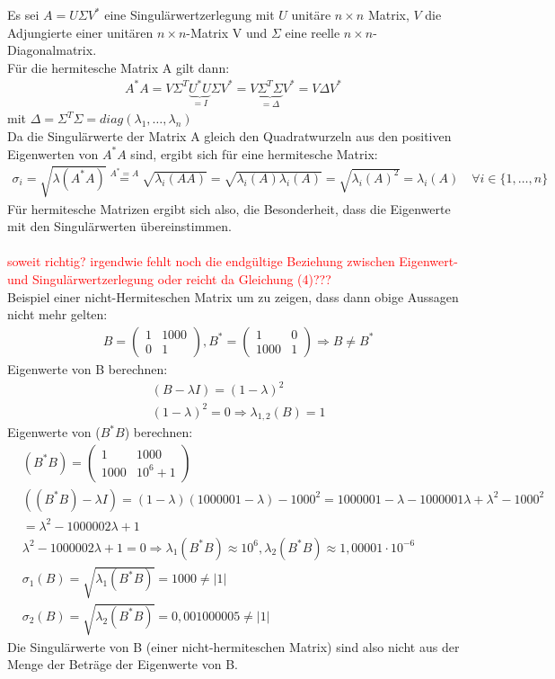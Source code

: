 Es sei $A=U\Sigma V^*$ eine Singulärwertzerlegung mit $U$ unitäre $n\times n$ Matrix, $V$ die Adjungierte einer unitären $n\times n$-Matrix V und $\Sigma$ eine reelle $n\times n$-Diagonalmatrix.\\
Für die hermitesche Matrix A gilt dann:
\begin{align}
A^*A=V\Sigma^T\underbrace{U^*U}_{=I}\Sigma V^* = V\underbrace{\Sigma^T\Sigma}_{=\Delta}V^*=V\Delta V^*
\end{align}
mit $\Delta=\Sigma^T \Sigma=diag(\lambda_1,\ldots,\lambda_n)$\\
\newline
Da die Singulärwerte der Matrix A gleich den Quadratwurzeln aus den positiven Eigenwerten von $A^*A$ sind, ergibt sich für eine hermitesche Matrix:
\begin{align*}
	\sigma_i=\sqrt{\lambda(A^*A)} \overset{A^*=A}{=} \sqrt{\lambda_i(AA)}=\sqrt{\lambda_i(A)\lambda_i(A)}=\sqrt{\lambda_i(A)^2}=\lambda_i(A) \quad \forall i\in\{1,\ldots,n\}
\end{align*}
Für hermitesche Matrizen ergibt sich also, die Besonderheit, dass die Eigenwerte mit den Singulärwerten übereinstimmen.\\\\
\textcolor{red}{soweit richtig? irgendwie fehlt noch die endgültige Beziehung zwischen Eigenwert- und Singulärwertzerlegung oder reicht da Gleichung (4)???}\\
\newline
Beispiel einer nicht-Hermiteschen Matrix um zu zeigen, dass dann obige Aussagen nicht mehr gelten:
\begin{align*}
&B=
\begin{pmatrix}
	1 & 1000\\
	0 & 1
\end{pmatrix}, 
B^*=
\begin{pmatrix}
1 & 0\\
1000 & 1
\end{pmatrix}
\Rightarrow B\neq B^*\end{align*}
Eigenwerte von B berechnen:
\begin{align*}
&(B-\lambda I)=(1-\lambda)^2\\
&(1-\lambda)^2=0 \Rightarrow \lambda_{1,2}(B)=1
\end{align*}
Eigenwerte von ($B^*B$) berechnen:
\begin{align*}
&(B^*B)=
\begin{pmatrix}
1 & 1000\\
1000 & 10^6+1
\end{pmatrix}\\
&((B^*B)-\lambda I)=(1-\lambda)(1000001-\lambda)-1000^2=1000001-\lambda-1000001\lambda+\lambda^2-1000^2\\ &=\lambda^2-1000002\lambda+1\\
&\lambda^2-1000002\lambda+1=0 \Rightarrow \lambda_{1}(B^*B)\approx 10^6, \lambda_{2}(B^*B) \approx 1,00001\cdot 10^{-6}\\
&\sigma_1(B)=\sqrt{\lambda_1(B^*B)}=1000 \neq |1|\\
&\sigma_2(B)=\sqrt{\lambda_2(B^*B)}=0,001000005 \neq|1|
\end{align*}
Die Singulärwerte von B (einer nicht-hermiteschen Matrix) sind also nicht aus der Menge der Beträge der Eigenwerte von B.